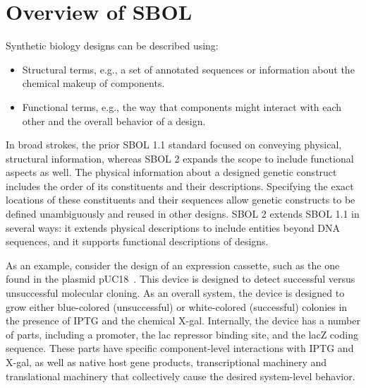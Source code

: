 \section{Overview of SBOL}

Synthetic biology designs can be described using:
\begin{itemize}
\item Structural terms, e.g., a set of annotated sequences or information about the chemical makeup of components.
\item Functional terms, e.g., the way that components might interact with each other and the overall behavior of a design.
\end{itemize}
In broad strokes, the prior SBOL 1.1 standard focused on conveying physical, structural information, whereas SBOL 2 expands the scope to include functional aspects as well. 
The physical information about a designed genetic construct includes the order of its constituents and their descriptions. Specifying the exact locations of these constituents and their sequences allow genetic constructs to be defined unambiguously and reused in other designs. SBOL 2 extends SBOL 1.1 in several ways: it extends physical descriptions to include entities beyond DNA sequences, and it supports functional descriptions of designs. 

As an example, consider the design of an expression cassette, such as the one found in the plasmid pUC18~\cite{L08752.1}. This device is designed to detect successful versus unsuccessful molecular cloning. 
As an overall system, the device is designed to grow either blue-colored (unsuccessful) or white-colored (successful) colonies in the presence of IPTG and the chemical X-gal. Internally, the device has a number of parts, including a promoter, the lac repressor binding site, and the lacZ coding sequence. 
These parts have specific component-level interactions with IPTG and X-gal, as well as native host gene products, transcriptional machinery and translational machinery that collectively cause the desired system-level behavior. 

